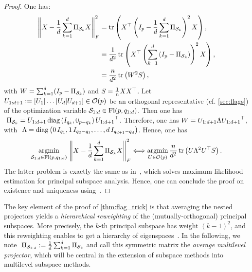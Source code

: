 \begin{proof} 
One has:
\begin{align}
	\norm{X - \frac 1 d \sum_{k=1}^d \Pi_{\S_k} X}_F^2
	&= \tr{X\T \lrp{I_p - \frac1d\sum_{k=1}^d \Pi_{\S_k}}^2 X},\\
	&= \frac1{d^2} \tr{X\T \lrp{\sum_{k=1}^d \lrp{I_p - \Pi_{\S_k}}}^2 X},\\
	&= \frac n {d^2} \tr{W^2 S},
\end{align}
with $W = \sum_{k=1}^d (I_p - \Pi_{\S_k})$ and $S = \frac 1 n X X\T$.
	Let $U_{1:d+1} := [U_1|\dots|U_d|U_{d+1}]\in\O(p)$ be an orthogonal representative (cf. \autoref{sec:flags}) of the optimization variable $\S_{1:d} \in \Fl(p, q_{1:d})$. Then one has $~{\Pi_{\S_k} = U_{1:d+1} \diag{I_{q_k}, 0_{p - q_k}} {U_{1:d+1}}\T}$. Therefore, one has $W = U_{1:d+1} \Lambda {U_{1:d+1}}\T$, with $~{\Lambda = \diag{0 \, I_{q_1}, 1 \, I_{q_2 - q_1}, \dots, d \, I_{q_{d+1} - q_d}}}$.
	Hence, one has 
	\begin{equation}
		\argmin{\S_{1:d} \in \Fl(p, q_{1:d})} \norm{X - \frac 1 d \sum_{k=1}^d \Pi_{\S_k} X}_F^2 \Longleftrightarrow \argmin{U \in \O(p)} \frac n {d^2} \tr{U \Lambda^2 U\T S}.
	\end{equation}
	The latter problem is exactly the same as in~\citet[Equation~(19)]{szwagier_curse_2024}, which solves maximum likelihood estimation for principal subspace analysis.
	Hence, one can conclude the proof on existence and uniqueness using~\citet[Theorem~B.1]{szwagier_curse_2024}.
\end{proof}
The key element of the proof of \autoref{thm:flag_trick} is that averaging the nested projectors yields a \textit{hierarchical reweighting} of the (mutually-orthogonal) principal subspaces. More precisely, the $k$-th principal subspace has weight $(k-1)^2$, and this reweighting enables to get a hierarchy of eigenspaces~\citep{cunningham_linear_2015,pennec_barycentric_2018,oftadeh_eliminating_2020}.
In the following, we note $~{\Pi_{\S_{1:d}} := \frac 1 d \sum_{k=1}^d \Pi_{\S_k}}$ and call this symmetric matrix the \textit{average multilevel projector}, which will be central in the extension of subspace methods into multilevel subspace methods.



